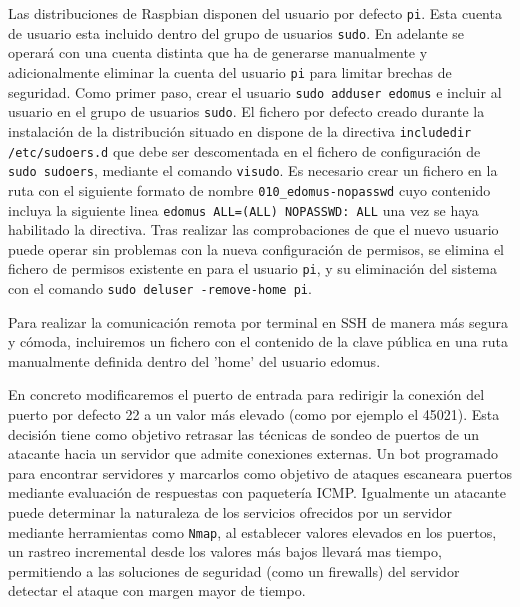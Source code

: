 \vspace{1cm}

Las distribuciones de Raspbian disponen del usuario por defecto \verb|pi|. Esta cuenta de usuario esta incluido dentro del grupo de usuarios \verb|sudo|. En adelante se operará con una cuenta distinta que ha de generarse manualmente y adicionalmente eliminar la cuenta del usuario \verb|pi| para limitar brechas de seguridad. Como primer paso, crear el usuario \verb|sudo adduser edomus| e incluir al usuario en el grupo de usuarios \verb|sudo|. El fichero por defecto creado durante la instalación de la distribución situado en  dispone de la directiva \verb|includedir /etc/sudoers.d| que debe ser descomentada en el fichero de configuración de \verb|sudo sudoers|, mediante el comando \verb|visudo|. Es necesario crear un fichero en la ruta  con el siguiente formato de nombre \verb|010_edomus-nopasswd| cuyo contenido incluya la siguiente linea \verb|edomus ALL=(ALL) NOPASSWD: ALL| una vez se haya habilitado la directiva. Tras realizar las comprobaciones de que el nuevo usuario puede operar sin problemas con la nueva configuración de permisos, se elimina el fichero de permisos existente en  para el usuario \verb|pi|, y su eliminación del sistema con el comando \verb|sudo deluser -remove-home pi|.

\vspace{1cm}

Para realizar la comunicación remota por terminal en SSH de manera más segura y cómoda, incluiremos un fichero con el contenido de la clave pública en una ruta manualmente definida dentro del 'home' del usuario edomus.

\vspace{1cm}

En concreto modificaremos el puerto de entrada para redirigir la conexión del puerto por defecto 22 a un valor más elevado (como por ejemplo el 45021). Esta decisión tiene como objetivo retrasar las técnicas de sondeo de puertos de un atacante hacia un servidor que admite conexiones externas. Un bot programado para encontrar servidores y marcarlos como objetivo de ataques escaneara puertos mediante evaluación de respuestas con paquetería ICMP. Igualmente un atacante puede determinar la naturaleza de los servicios ofrecidos por un servidor mediante herramientas como \verb|Nmap|, al establecer valores elevados en los puertos, un rastreo incremental desde los valores más bajos llevará mas tiempo, permitiendo a las soluciones de seguridad (como un firewalls) del servidor detectar el ataque con margen mayor de tiempo.

